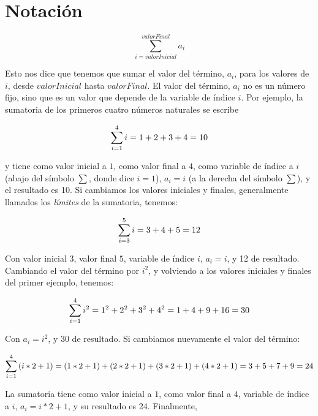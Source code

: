 \section{Notación}

\begin{equation}
	\sum_{i=valorInicial}^{valorFinal}{a_i}
\end{equation}

Esto nos dice que tenemos que sumar el valor del término, $a_i$, para los valores de $i$, desde $valorInicial$ hasta $valorFinal$. El valor del término, $a_i$ no es un número fijo, sino que es un valor que depende de la variable de índice $i$. Por ejemplo, la sumatoria de los primeros cuatro números naturales se escribe

\begin{equation}
  \sum_{i=1}^4{i}=1+2+3+4=10\\
\end{equation}

y tiene como valor inicial a $1$, como valor final a $4$, como variable de índice a $i$ (abajo del símbolo $\sum$, donde dice $i=1$), $a_i=i$ (a la derecha del símbolo $\sum$), y el resultado es 10. Si cambiamos los valores iniciales y finales, generalmente llamados los \textit{límites} de la sumatoria, tenemos:

\begin{equation}
  \sum_{i=3}^5{i}=3+4+5=12\\
\end{equation}

Con valor inicial $3$, valor final $5$, variable de índice $i$, $a_i=i$, y 12 de resultado. Cambiando el valor del término por $i^2$, y volviendo a los valores iniciales y finales del primer ejemplo,  tenemos:

\begin{equation}
  \sum_{i=1}^4{i^2}=1^2+2^2+3^2+4^2=1+4+9+16=30\\
\end{equation}

Con $a_i=i^2$, y 30 de resultado. Si cambiamos nuevamente el valor del término:

\begin{equation}
  \sum_{i=1}^4{(i*2+1)}=(1*2+1)+(2*2+1)+(3*2+1)+(4*2+1)=3+5+7+9=24\\
\end{equation}

La sumatoria tiene como valor inicial a $1$, como valor final a $4$, variable de índice a $i$, $a_i=i*2+1$, y su resultado es 24. Finalmente,

